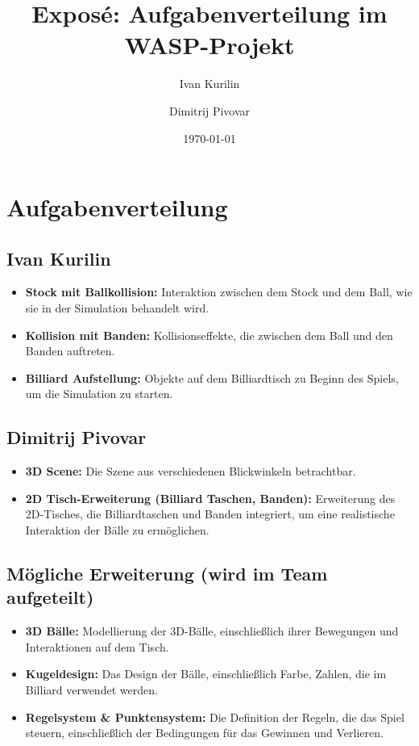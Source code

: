 \documentclass[11pt,a4paper]{article}
\title{Exposé: Aufgabenverteilung im WASP-Projekt}
\author{Ivan Kurilin \and Dimitrij Pivovar}
\date{\today}
\begin{document}
	
	\maketitle		
	\section*{Aufgabenverteilung}
	
\subsection*{Ivan Kurilin}
\begin{itemize}
	\item \textbf{Stock mit Ballkollision:} Interaktion zwischen dem Stock und dem Ball, wie sie in der Simulation behandelt wird.
	\item \textbf{Kollision mit Banden:} Kollisionseffekte, die zwischen dem Ball und den Banden auftreten.
	\item \textbf{Billiard Aufstellung:} Objekte auf dem Billiardtisch zu Beginn des Spiels, um die Simulation zu starten.
\end{itemize}
	
\subsection*{Dimitrij Pivovar}
\begin{itemize}
	\item \textbf{3D Scene:} Die Szene aus verschiedenen Blickwinkeln betrachtbar.
	\item \textbf{2D Tisch-Erweiterung (Billiard Taschen, Banden):} Erweiterung des 2D-Tisches, die Billiardtaschen und Banden integriert, um eine realistische Interaktion der Bälle zu ermöglichen.
\end{itemize}

\subsection*{Mögliche Erweiterung (wird im Team aufgeteilt)}
\begin{itemize}
	\item \textbf{3D Bälle:} Modellierung der 3D-Bälle, einschließlich ihrer Bewegungen und Interaktionen auf dem Tisch.
	\item \textbf{Kugeldesign:} Das Design der Bälle, einschließlich Farbe, Zahlen, die im Billiard verwendet werden.
	\item \textbf{Regelsystem \& Punktensystem:} Die Definition der Regeln, die das Spiel steuern, einschließlich der Bedingungen für das Gewinnen und Verlieren.
\end{itemize}
\end{document}
